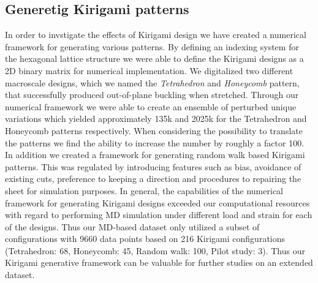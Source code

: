 \subsection{Generetig Kirigami patterns}
In order to invstigate the effects of Kirigami design we have created a
numerical framework for generating various patterns. By defining an indexing
system for the hexagonal lattice structure we were able to define the Kirigami
designs as a 2D binary matrix for numerical implementation. We digitalized two
different macroscale designs, which we named the \textit{Tetrahedron} and
\textit{Honeycomb} pattern, that successfully produced out-of-plane
buckling when stretched. Through our numerical framework we were able to create an ensemble of perturbed unique variations which yielded approximately 135k and 2025k for the Tetrahedron and Honeycomb patterns respectively. When considering the possibility to translate the patterns we find the ability to increase the number by roughly a factor 100. In addition we created a framework for generating random walk based Kirigami patterns. This was regulated by introducing features such as bias, avoidance of existing cuts,
preference to keeping a direction and procedures to repairing the sheet for
simulation purposes. In general, the capabilities of the numerical framework for
generating Kirigami designs exceeded our computational resources with regard to performing \acrshort{MD} simulation under different load and strain for each of the designs. Thus our \acrshort{MD}-based dataset only utilized a subset of configurations with 9660 data points based on 216 Kirigami configurations (Tetrahedron: 68, Honeycomb: 45, Random walk: 100, Pilot study: 3). Thus our  Kirigami generative framework can be valuable for further studies on an extended dataset.



